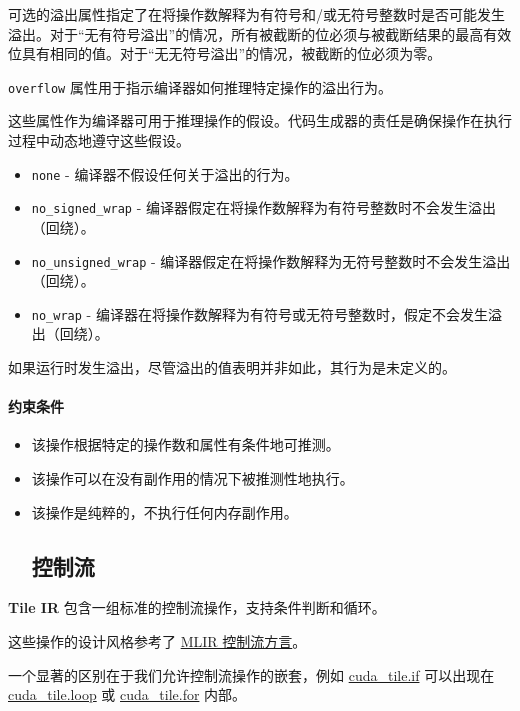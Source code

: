 \documentclass{article}
\begin{document}
可选的溢出属性指定了在将操作数解释为有符号和/或无符号整数时是否可能发生溢出。对于``无有符号溢出''的情况，所有被截断的位必须与被截断结果的最高有效位具有相同的值。对于``无无符号溢出''的情况，被截断的位必须为零。


\texttt{overflow} 属性用于指示编译器如何推理特定操作的溢出行为。


这些属性作为编译器可用于推理操作的假设。代码生成器的责任是确保操作在执行过程中动态地遵守这些假设。


\begin{itemize}
\item \texttt{none} - 编译器不假设任何关于溢出的行为。
\item \texttt{no\_signed\_wrap} - 编译器假定在将操作数解释为有符号整数时不会发生溢出（回绕）。
\item \texttt{no\_unsigned\_wrap} - 编译器假定在将操作数解释为无符号整数时不会发生溢出（回绕）。
\item \texttt{no\_wrap} - 编译器在将操作数解释为有符号或无符号整数时，假定不会发生溢出（回绕）。

\end{itemize}
如果运行时发生溢出，尽管溢出的值表明并非如此，其行为是未定义的。



\paragraph{约束条件}

\begin{itemize}
\item 该操作根据特定的操作数和属性有条件地可推测。
\item 该操作可以在没有副作用的情况下被推测性地执行。
\item 该操作是纯粹的，不执行任何内存副作用。



\subsection{控制流}

\end{itemize}
\textbf{Tile IR} 包含一组标准的控制流操作，支持条件判断和循环。


这些操作的设计风格参考了 \href{https://mlir.llvm.org/docs/Dialects/ControlFlow/}{MLIR 控制流方言}。


一个显著的区别在于我们允许控制流操作的嵌套，例如 \href{https://docs.nvidia.com/cuda/tile-ir/latest/sections/operations.html#op-cuda-tile-if}{cuda\_tile.if} 可以出现在 \href{https://docs.nvidia.com/cuda/tile-ir/latest/sections/operations.html#op-cuda-tile-loop}{cuda\_tile.loop} 或 \href{https://docs.nvidia.com/cuda/tile-ir/latest/sections/operations.html#op-cuda-tile-for}{cuda\_tile.for} 内部。
\end{document}
